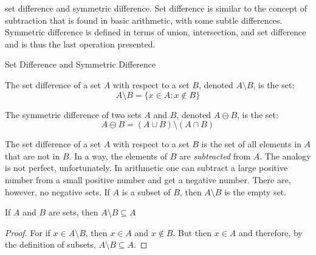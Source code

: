 \documentclass[crop=false,class=book,oneside]{standalone}
\begin{document}
            set difference and symmetric difference. Set
            difference is similar to the concept of subtraction
            that is found in basic arithmetic, with some subtle
            differences. Symmetric difference is defined in terms
            of union, intersection, and set difference and is
            thus the last operation presented.
            \begin{fdefinition*}
                  {Set Difference and Symmetric Difference}{}
                \begin{definition}
                    The set difference of a set $A$ with respect
                    to a set $B$, denoted $A\setminus{B}$,
                    is the set:
                    \begin{equation*}
                        A\setminus{B}=
                        \{x\in{A}:x\notin{B}\}
                    \end{equation*}
                \end{definition}
                \begin{definition}
                    The symmetric difference of two sets $A$ and
                    $B$, denoted $A\ominus{B}$, is the set:
                    \begin{equation*}
                        A\ominus{B}=
                        (A\cup{B})\setminus(A\cap{B})
                    \end{equation*}
                \end{definition}
            \end{fdefinition*}
            The set difference of a set $A$ with respect to a
            set $B$ is the set of all elements in $A$ that are
            not in $B$. In a way, the elements of $B$ are
            \textit{subtracted} from $A$. The analogy is not
            perfect, unfortunately. In arithmetic one
            can subtract a large positive number from a small
            positive number and get a \textrm{negative} number.
            There are, however, no negative sets. If $A$ is a
            subset of $B$, then $A\setminus{B}$ is the empty set.
            \begin{theorem}
                \label{thm:ELEM_ALG:Subset_of_Set_Difference}
                If $A$ and $B$ are sets, then
                $A\setminus{B}\subseteq{A}$
            \end{theorem}
            \begin{proof}
                For if $x\in{A}\setminus{B}$, then
                $x\in{A}$ and $x\notin{B}$. But then
                $x\in{A}$ and therefore, by
                the definition of subsets,
                $A\setminus{B}\subseteq{A}$.
            \end{proof}
\end{document}
